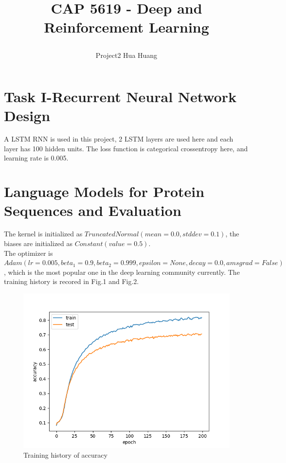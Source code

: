 \documentclass[12pt]{article}
\begin{document}
\title*{\centerline{\LARGE{CAP 5619 \-- Deep and Reinforcement Learning}}}
\author*{\centerline{Project2 Hua Huang}}%

\section{Task I-Recurrent Neural Network Design}
A LSTM RNN is used in this project, 2 LSTM layers are used here and
each layer has 100 hidden units. The loss function is categorical
crossentropy here, and learning rate is 0.005.

\section{Language Models for Protein Sequences and Evaluation}
The kernel is initialized as 
$TruncatedNormal(mean=0.0, stddev=0.1)$, the biases are
initialized as $Constant(value=0.5)$.\\
The optimizer is $Adam(lr=0.005, beta_1=0.9, beta_2=0.999,
epsilon=None, decay=0.0, amsgrad=False)$, which is the most popular
one in the deep learning community currently. The training history is 
recored in Fig.1 and Fig.2.\\
\begin{figure}[h]
    \centering
    \includegraphics [scale=0.5]{accuracy.png}
    \caption {Training history of accuracy}
\end{figure}
\end{document}
